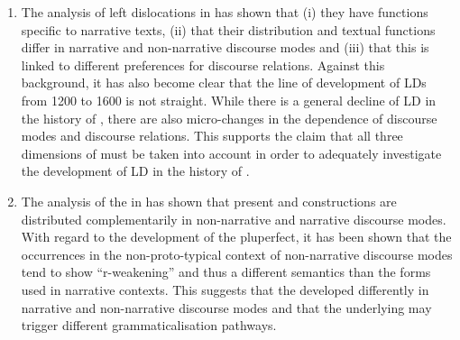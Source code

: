 \documentclass[output=paper,colorlinks,citecolor=brown]{langscibook}
\begin{document}
\begin{enumerate}
\item 
The analysis of left dislocations in  has shown that (i) they have functions specific to narrative texts, (ii) that their distribution and textual functions differ in narrative and non-narrative discourse modes and (iii) that this is linked to different preferences for discourse relations. Against this background, it has also become clear that the line of development of LDs from 1200 to 1600 is not straight. While there is a general decline of LD in the history of , there are also micro-changes in the dependence of discourse modes and discourse relations. This supports the claim that all three dimensions of  must be taken into account in order to adequately investigate the development of LD in the history of . 
\item 
The analysis of the  in  has shown that present and  constructions are distributed complementarily in non-narrative and narrative discourse modes. With regard to the development of the pluperfect, it has been shown that the occurrences in the non-proto-typical context of non-narrative discourse modes tend to show “r-weakening” and thus a different semantics than the  forms used in narrative contexts. This suggests that the  developed differently in narrative and non-narrative discourse modes and that the underlying  may trigger different grammaticalisation pathways. 
\end{enumerate}
\end{document}
